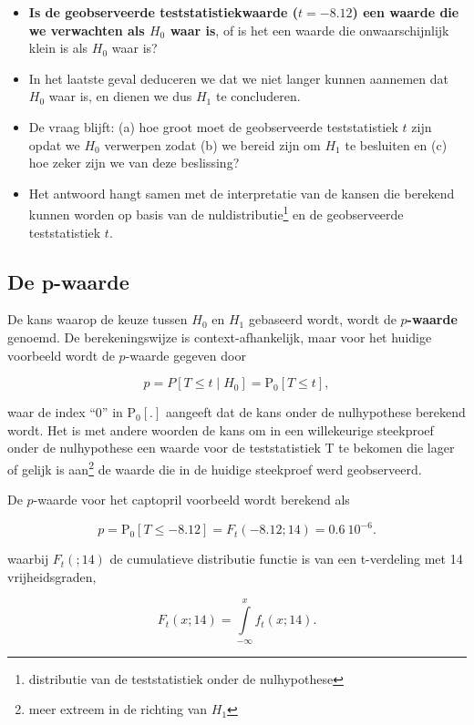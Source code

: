 \documentclass[
  12pt,dutch]{book}
\providecommand{\tightlist}{%
  \setlength{\itemsep}{0pt}\setlength{\parskip}{0pt}}
\theoremstyle{definition}
\theoremstyle{definition}
\theoremstyle{definition}
\theoremstyle{definition}
\theoremstyle{remark}
\begin{document}
\begin{itemize}
\tightlist
\item
  \textbf{Is de geobserveerde teststatistiekwaarde (\(t=-8.12\)) een waarde die we verwachten als \(H_0\) waar is}, of is het een waarde die onwaarschijnlijk klein is als \(H_0\) waar is?
\item
  In het laatste geval deduceren we dat we niet langer kunnen aannemen dat \(H_0\) waar is, en dienen we dus \(H_1\) te concluderen.
\item
  De vraag blijft: (a) hoe groot moet de geobserveerde teststatistiek \(t\) zijn opdat we \(H_0\) verwerpen zodat (b) we bereid zijn om \(H_1\) te besluiten en (c) hoe zeker zijn we van deze beslissing?
\item
  Het antwoord hangt samen met de interpretatie van de kansen die berekend kunnen worden op basis van de nuldistributie\footnote{distributie van de teststatistiek onder de nulhypothese} en de geobserveerde teststatistiek \(t\).
\end{itemize}

\subsection{De p-waarde}\label{de-p-waarde}

De kans waarop de keuze tussen \(H_0\) en \(H_1\) gebaseerd wordt, wordt de \textbf{\(p\)-waarde} genoemd. De berekeningswijze is context-afhankelijk, maar voor het huidige voorbeeld wordt de \(p\)-waarde gegeven door

\[
    p = P\left[T \leq t \mid H_0\right] = \text{P}_0\left[T\leq t\right],
  \]

waar de index ``0'' in \(\text{P}_0\left[.\right]\) aangeeft dat de kans onder de nulhypothese berekend wordt. Het is met andere woorden de kans om in een willekeurige steekproef onder de nulhypothese een waarde voor de teststatistiek T te bekomen die lager of gelijk is aan\footnote{meer extreem in de richting van \(H_1\)} de waarde die in de huidige steekproef werd geobserveerd.

De \(p\)-waarde voor het captopril voorbeeld wordt berekend als

\[p= \text{P}_0\left[T\leq -8.12\right]=F_t(-8.12;14) = 0.6\ 10^{-6}.\]

waarbij \(F_t(;14)\) de cumulatieve distributie functie is van een t-verdeling met 14 vrijheidsgraden,

\[F_t(x;14)=\int\limits_{-\infty}^{x} f_t(x;14).\]
\end{document}
